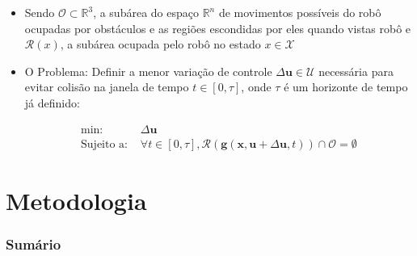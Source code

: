 \documentclass{beamer}
\begin{document}
\begin{frame}[allowframebreaks]
\begin{itemize}
		\item Sendo $\mathcal{O} \subset \mathbb{R}^3$, a subárea do espaço $\mathbb{R}^n$ de movimentos possíveis do robô ocupadas por obstáculos e as regiões escondidas por eles quando vistas robô e $\mathcal{R}(x)$, a subárea ocupada pelo robô no estado $x \in \mathcal{X}$
			
		\item O Problema: Definir a menor variação de controle $\Delta\mathbf{u} \in \mathcal{U}$ necessária para evitar colisão na janela de tempo $t \in [0,\tau]$, onde $\tau$ é um horizonte de tempo já definido:
		
		\begin{equation}
		\begin{aligned}
		\text{min: }& \Delta\mathbf{u} \\
		\text{Sujeito a: }& \forall t \in [0,\tau], \mathcal{R}(\mathbf{g}(\mathbf{x}, \mathbf{u}+\Delta\mathbf{u}, t)) \cap \mathcal{O} = \emptyset
		\end{aligned}
		\label{eq:equacaoProb}
		\end{equation}
		
		
	\end{itemize}	 
\end{frame}


\section{Metodologia}

\begin{frame}
	\frametitle{Sumário}
	\tableofcontents[currentsection]
\end{frame}
\end{document}
